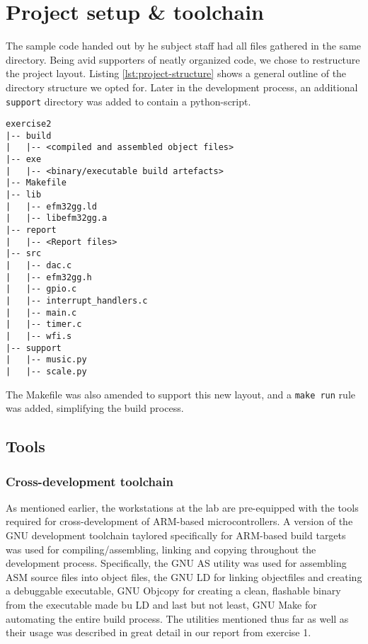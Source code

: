 \section{Project setup \& toolchain}

The sample code handed out by he subject staff had all files gathered in the same directory. Being avid supporters of neatly organized code, we chose to restructure the project layout. Listing \ref{lst:project-structure} shows a general outline of the directory structure we opted for. Later in the development process, an additional \texttt{support} directory was added to contain a python-script.

\begin{lstlisting}[label=lst:project-structure, caption=Revised project structure]
exercise2
|-- build
|   |-- <compiled and assembled object files>
|-- exe
|   |-- <binary/executable build artefacts>
|-- Makefile
|-- lib
|   |-- efm32gg.ld
|   |-- libefm32gg.a
|-- report
|   |-- <Report files>
|-- src
|   |-- dac.c
|   |-- efm32gg.h
|   |-- gpio.c
|   |-- interrupt_handlers.c
|   |-- main.c
|   |-- timer.c
|   |-- wfi.s
|-- support
|   |-- music.py
|   |-- scale.py
\end{lstlisting}

The Makefile was also amended to support this new layout, and a \texttt{make run} rule was added, simplifying the build process.

\subsection{Tools}

\subsubsection{Cross-development toolchain}

As mentioned earlier, the workstations at the lab are pre-equipped with the tools required for cross-development of ARM-based microcontrollers. A version of the GNU development toolchain taylored specifically for ARM-based build targets was used for compiling/assembling, linking and copying throughout the development process. Specifically, the GNU AS \cite[p.~4]{exercise1report} utility was used for assembling ASM source files into object files, the GNU LD \cite[p.~4]{exercise1report} for linking objectfiles and creating a debuggable executable, GNU Objcopy \cite[p.~5]{exercise1report} for creating a clean, flashable binary from the executable made bu LD and last but not least, GNU Make \cite[p.~5]{exercise1report} for automating the entire build process. The utilities mentioned thus far as well as their usage was described in great detail in our report from exercise 1.

